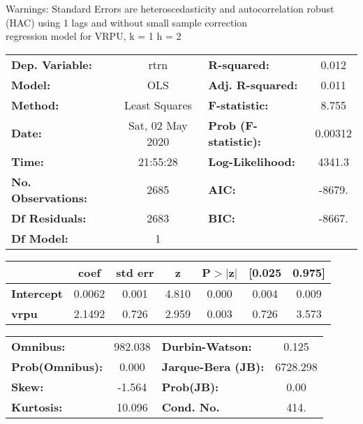Warnings: \newline
 [1] Standard Errors are heteroscedasticity and autocorrelation robust (HAC) using 1 lags and without small sample correction\\ 

regression model for VRPU, k = 1 h = 2\begin{center}
\begin{tabular}{lclc}
\toprule
\textbf{Dep. Variable:}    &       rtrn       & \textbf{  R-squared:         } &     0.012   \\
\textbf{Model:}            &       OLS        & \textbf{  Adj. R-squared:    } &     0.011   \\
\textbf{Method:}           &  Least Squares   & \textbf{  F-statistic:       } &     8.755   \\
\textbf{Date:}             & Sat, 02 May 2020 & \textbf{  Prob (F-statistic):} &  0.00312    \\
\textbf{Time:}             &     21:55:28     & \textbf{  Log-Likelihood:    } &    4341.3   \\
\textbf{No. Observations:} &        2685      & \textbf{  AIC:               } &    -8679.   \\
\textbf{Df Residuals:}     &        2683      & \textbf{  BIC:               } &    -8667.   \\
\textbf{Df Model:}         &           1      & \textbf{                     } &             \\
\bottomrule
\end{tabular}
\begin{tabular}{lcccccc}
                   & \textbf{coef} & \textbf{std err} & \textbf{z} & \textbf{P$> |$z$|$} & \textbf{[0.025} & \textbf{0.975]}  \\
\midrule
\textbf{Intercept} &       0.0062  &        0.001     &     4.810  &         0.000        &        0.004    &        0.009     \\
\textbf{vrpu}      &       2.1492  &        0.726     &     2.959  &         0.003        &        0.726    &        3.573     \\
\bottomrule
\end{tabular}
\begin{tabular}{lclc}
\textbf{Omnibus:}       & 982.038 & \textbf{  Durbin-Watson:     } &    0.125  \\
\textbf{Prob(Omnibus):} &   0.000 & \textbf{  Jarque-Bera (JB):  } & 6728.298  \\
\textbf{Skew:}          &  -1.564 & \textbf{  Prob(JB):          } &     0.00  \\
\textbf{Kurtosis:}      &  10.096 & \textbf{  Cond. No.          } &     414.  \\
\bottomrule
\end{tabular}
\end{center}

